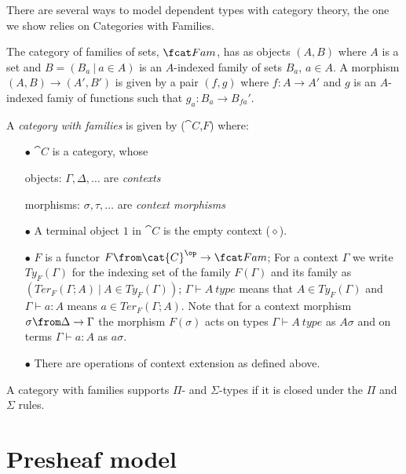 There are several ways to model dependent types with category theory, the one
we show relies on Categories with Families.

\begin{definition}
  The category of families of sets, $\Fam$, has as objects $(A, B)$ where
  $A$ is a set and $B = (B_a~|~a \in A)$ is an $A$-indexed family of sets $B_a$,
  $a \in A$. A morphism $(A, B) \to (A', B')$ is given by a pair $(f, g)$ where
  $f: A \to A'$ and $g$ is an $A$-indexed famiy of functions such that $g_a: B_a
  \to B_{fa}'$.
\end{definition}

\begin{definition}
A \emph{category with families} is given by ($\cat{C}$,$F$) where:

\begin{itemize}
  \item[$\bullet$] $\cat{C}$ is a category, whose

    objects: $\Gamma, \Delta, \dots$ are \emph{contexts}

    morphisms:  $\sigma, \tau, \dots$ are \emph{context morphisms}

  \item[$\bullet$] A terminal object $1$ in $\cat{C}$ is the empty context ($\diamond$).

  \item[$\bullet$] $F$ is a functor $F\from \cat{C}^\op \to \Fam$; For a
    context $\Gamma$ we write $Ty_F(\Gamma)$ for the indexing set of the family
    $F(\Gamma)$ and its family as $(Ter_F(\Gamma;A)~|~A \in Ty_F(\Gamma))$;
    $\Gamma \vdash A~type$ means that $A \in Ty_F(\Gamma)$ and $\Gamma \vdash a
    : A$ means $a \in Ter_F(\Gamma;A)$. Note that for a context morphism
    $\sigma \from \Delta \to \Gamma$ the morphism $F(\sigma)$ acts on types
    $\Gamma \vdash A~type$ as $A\sigma$ and on terms $\Gamma \vdash a : A$ as
    $a\sigma$.

  \item[$\bullet$] There are operations of context extension as defined above.
\end{itemize}
\end{definition}

A category with families supports $\Pi$- and $\Sigma$-types if it is closed
under the $\Pi$ and $\Sigma$ rules.

\section*{Presheaf model}

